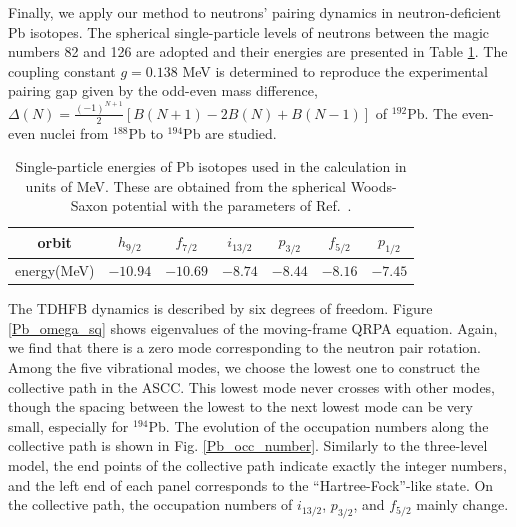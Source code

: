 \documentclass[%
superscriptaddress,
showpacs,
nofootinbib,
amsmath,amssymb,
aps,
prc,
twocolumn,
floatfix ]%
{revtex4-1}
\begin{document}
Finally, we apply our method to neutrons' pairing dynamics in 
neutron-deficient Pb isotopes.
The spherical single-particle levels of neutrons
between the magic numbers 82 and 126 are adopted and
their energies are presented in Table \ref{Pb}. 
The coupling constant $g=0.138$ MeV is determined to reproduce
the experimental pairing gap given by the odd-even mass difference,
$\Delta(N)=\frac{(-1)^{N+1}}{2}[B(N+1)-2B(N)+B(N-1)]$ of ${}^{192}$Pb.
The even-even nuclei from ${}^{188}$Pb to ${}^{194}$Pb
are studied.
\begin{table}[htbp]
\caption{Single-particle energies of Pb isotopes used in the calculation
in units of MeV.
These are obtained from the spherical Woods-Saxon potential
with the parameters of Ref.~\cite{BM69}.
}
\begin{ruledtabular}
\begin{tabular}{c|cccccc}
  orbit& $h_{9/2}$ & $f_{7/2}$ & $i_{13/2}$ & $p_{3/2}$ & $f_{5/2}$ & $p_{1/2}$\\ \hline
  energy(MeV)& $-10.94$ & $-10.69$ & $-8.74$ & $-8.44$ & $-8.16$ & $-7.45$\\
\end{tabular}
\end{ruledtabular}
\label{Pb}
\end{table}

The TDHFB dynamics is described by six degrees of freedom.
Figure \ref{Pb_omega_sq} shows eigenvalues of the
moving-frame QRPA equation.
Again, we find that there is a zero mode corresponding to
the neutron pair rotation.
Among the five vibrational modes, we choose the lowest one to
construct the collective path in the ASCC.
This lowest mode never crosses with other modes,
though the spacing between the lowest to the next lowest mode
can be very small, especially for ${}^{194}$Pb.
The evolution of the occupation numbers along the collective path
is shown in Fig. \ref{Pb_occ_number}.
Similarly to the three-level model, 
the end points of the collective path indicate exactly
the integer numbers, and
the left end of each panel corresponds to the
``Hartree-Fock''-like state.
On the collective path, the occupation numbers of $i_{13/2}$, $p_{3/2}$, and
$f_{5/2}$ mainly change.
\end{document}
